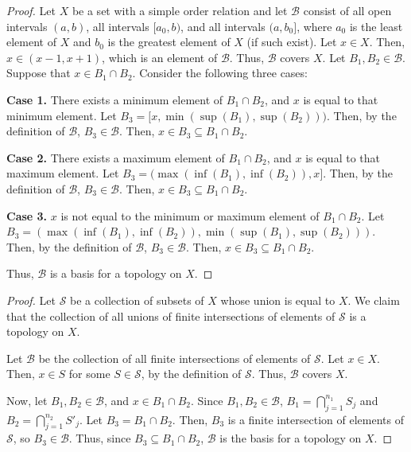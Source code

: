 \documentclass{article}
\newcommand{\B}{\mathcal B}
\begin{document}
\newpage
{}
\begin{proof}
    Let $X$ be a set with a simple order relation and let $\B$ consist of all open intervals $(a,b)$, all intervals $[a_0,b)$, and all intervals $(a, b_0]$, where $a_0$ is the least element of $X$ and $b_0$ is the greatest element of $X$ (if such exist).
    Let $x \in X$.
    Then, $x \in (x-1, x+1)$, which is an element of $\B$.
    Thus, $\B$ covers $X$.
    Let $B_1,B_2 \in \B$.
    Suppose that $x \in B_1 \cap B_2$.
    Consider the following three cases:

    {\bf Case 1.} There exists a minimum element of $B_1 \cap B_2$, and $x$ is equal to that minimum element.
    Let $B_3 = [x, \min(\sup(B_1), \sup(B_2)))$.
    Then, by the definition of $\B$, $B_3 \in \B$.
    Then, $x \in B_3 \subseteq B_1 \cap B_2$.

    {\bf Case 2.} There exists a maximum element of $B_1 \cap B_2$, and $x$ is equal to that maximum element.
    Let $B_3 = (\max(\inf(B_1), \inf(B_2)), x]$.
    Then, by the definition of $\B$, $B_3 \in \B$.
    Then, $x \in B_3 \subseteq B_1 \cap B_2$.

    {\bf Case 3.} $x$ is not equal to the minimum or maximum element of $B_1 \cap B_2$.
    Let $B_3 = (\max(\inf(B_1), \inf(B_2)), \min(\sup(B_1), \sup(B_2)))$.
    Then, by the definition of $\B$, $B_3 \in \B$.
    Then, $x \in B_3 \subseteq B_1 \cap B_2$.

    Thus, $\B$ is a basis for a topology on $X$.
\end{proof}

\bigskip
{}
\begin{proof}
    Let $\mathcal S$ be a collection of subsets of $X$ whose union is equal to $X$.
    We claim that the collection of all unions of finite intersections of elements of $\mathcal S$ is a topology on $X$.

    Let $\mathcal B$ be the collection of all finite intersections of elements of $\mathcal S$.
    Let $x \in X$.
    Then, $x \in S$ for some $S \in \mathcal S$, by the definition of $\mathcal S$.
    Thus, $\mathcal B$ covers $X$.

    Now, let $B_1, B_2 \in \mathcal B$, and $x \in B_1 \cap B_2$.
    Since $B_1, B_2 \in \mathcal B$, $B_1 = \bigcap\limits_{j=1}^{n_1} S_j$ and $B_2 = \bigcap\limits_{j=1}^{n_2} S'_j$.
    Let $B_3 = B_1 \cap B_2$.
    Then, $B_3$ is a finite intersection of elements of $\mathcal S$, so $B_3 \in \B$.
    Thus, since $B_3 \subseteq B_1 \cap B_2$, $\B$ is the basis for a topology on $X$.
\end{proof}
\end{document}
